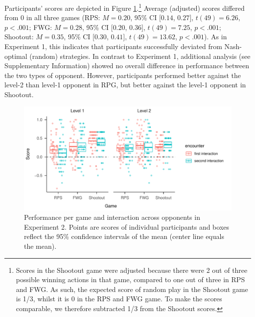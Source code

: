 \documentclass[smallextended]{svjour3}       %
\begin{document}
Participants' scores are depicted in Figure
\ref{fig:exp2-score-by-opp}.\footnote{Scores in the Shootout game were
  adjusted because there were 2 out of three possible winning actions in
  that game, compared to one out of three in RPS and FWG. As such, the
  expected score of random play in the Shootout game is 1/3, whilst it
  is 0 in the RPS and FWG game. To make the scores comparable, we
  therefore subtracted 1/3 from the Shootout scores.} Average (adjusted)
scores differed from 0 in all three games (RPS: \(M = 0.20\), 95\% CI
\([0.14\), \(0.27]\), \(t(49) = 6.26\), \(p < .001\); FWG: \(M = 0.28\),
95\% CI \([0.20\), \(0.36]\), \(t(49) = 7.25\), \(p < .001\); Shootout:
\(M = 0.35\), 95\% CI \([0.30\), \(0.41]\), \(t(49) = 13.62\),
\(p < .001\)). As in Experiment 1, this indicates that participants
successfully deviated from Nash-optimal (random) strategies. In contrast
to Experiment 1, additional analysis (see Supplementary Information)
showed no overall difference in performance between the two types of
opponent. However, participants performed better against the level-2
than level-1 opponent in RPG, but better against the level-1 opponent in
Shootout.

\begin{figure}

{\centering \includegraphics[width=\textwidth]{CBB_v2_files/figure-latex/exp2-score-by-opp-1} 

}

\caption{\label{fig:exp2-score-by-opp}Performance per game and interaction across opponents in Experiment 2. Points are scores of individual participants and boxes reflect the 95\% confidence intervals of the mean (center line equals the mean).}\label{fig:exp2-score-by-opp}
\end{figure}
\end{document}
